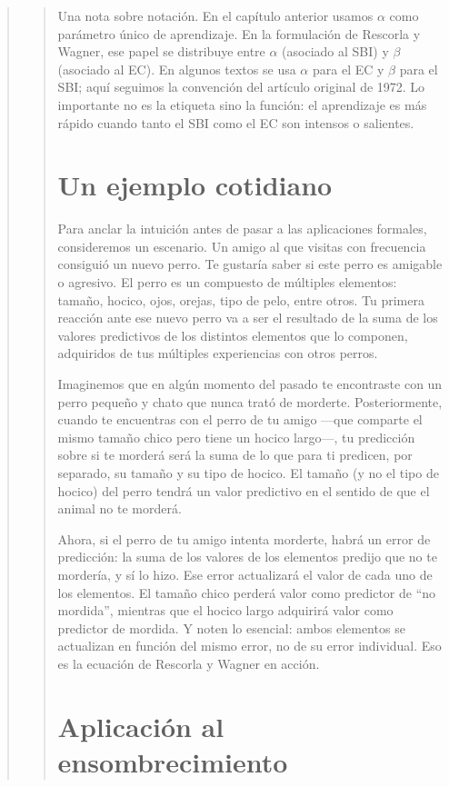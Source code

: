 \documentclass[
  letterpaper,
  DIV=11,
  numbers=noendperiod]{scrreprt}
\begin{document}
\begin{tcolorbox}[enhanced jigsaw, toprule=.15mm, arc=.35mm, colback=white, opacityback=0, colframe=quarto-callout-note-color-frame, breakable, rightrule=.15mm, left=2mm, leftrule=.75mm, bottomrule=.15mm]
\begin{quote}
\begin{quote}
Una nota sobre notación. En el capítulo anterior usamos \(\alpha\) como
parámetro único de aprendizaje. En la formulación de Rescorla y Wagner,
ese papel se distribuye entre \(\alpha\) (asociado al SBI) y \(\beta\)
(asociado al EC). En algunos textos se usa \(\alpha\) para el EC y
\(\beta\) para el SBI; aquí seguimos la convención del artículo original
de 1972. Lo importante no es la etiqueta sino la función: el aprendizaje
es más rápido cuando tanto el SBI como el EC son intensos o salientes.

\section{Un ejemplo cotidiano}\label{un-ejemplo-cotidiano}

Para anclar la intuición antes de pasar a las aplicaciones formales,
consideremos un escenario. Un amigo al que visitas con frecuencia
consiguió un nuevo perro. Te gustaría saber si este perro es amigable o
agresivo. El perro es un compuesto de múltiples elementos: tamaño,
hocico, ojos, orejas, tipo de pelo, entre otros. Tu primera reacción
ante ese nuevo perro va a ser el resultado de la suma de los valores
predictivos de los distintos elementos que lo componen, adquiridos de
tus múltiples experiencias con otros perros.

Imaginemos que en algún momento del pasado te encontraste con un perro
pequeño y chato que nunca trató de morderte. Posteriormente, cuando te
encuentras con el perro de tu amigo ---que comparte el mismo tamaño
chico pero tiene un hocico largo---, tu predicción sobre si te morderá
será la suma de lo que para ti predicen, por separado, su tamaño y su
tipo de hocico. El tamaño (y no el tipo de hocico) del perro tendrá un
valor predictivo en el sentido de que el animal no te morderá.

Ahora, si el perro de tu amigo intenta morderte, habrá un error de
predicción: la suma de los valores de los elementos predijo que no te
mordería, y sí lo hizo. Ese error actualizará el valor de cada uno de
los elementos. El tamaño chico perderá valor como predictor de ``no
mordida'', mientras que el hocico largo adquirirá valor como predictor
de mordida. Y noten lo esencial: ambos elementos se actualizan en
función del mismo error, no de su error individual. Eso es la ecuación
de Rescorla y Wagner en acción.

\section{Aplicación al
ensombrecimiento}\label{aplicaciuxf3n-al-ensombrecimiento}


\end{quote}
\end{quote}
\end{tcolorbox}
\end{document}
